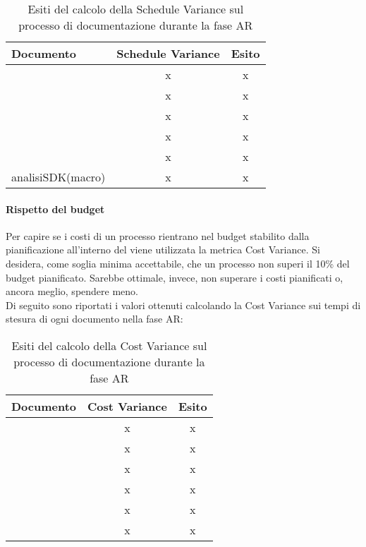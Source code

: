 \documentclass[PianoDiQualifica.tex]{subfiles}
\begin{document}
			\begin{table}[h]
				\centering
				\begin{tabular}{l c c}
					\hline
					\rule[-0.3cm]{0cm}{0.8cm}
					\textbf{Documento} & \textbf{Schedule Variance} & \textbf{Esito} \\
					\hline
					\rule[0cm]{0cm}{0.4cm}
					\PPdocRR & x & x \\
					\rule[0cm]{0cm}{0.4cm}
					\NPdocRR & x & x \\ 
					\rule[0cm]{0cm}{0.4cm}
					\ARdocRR & x & x \\ 
					\rule[0cm]{0cm}{0.4cm}
					\PQdocRR & x & x \\ 
					\rule[0cm]{0cm}{0.4cm}
					\Gldoc & x & x \\ 
					\rule[0cm]{0cm}{0.4cm}
					analisiSDK(macro) & x & x \\ 
					\hline
				\end{tabular}
				\caption{Esiti del calcolo della Schedule Variance sul processo di documentazione durante la fase AR}
			\end{table}
		\paragraph{Rispetto del budget}
		Per capire se i costi di un processo rientrano nel budget stabilito dalla pianificazione all'interno del 				\PPdocRR{} viene utilizzata la metrica Cost Variance. Si desidera, come soglia minima accettabile, che un 				processo non superi il 10\% del budget pianificato. Sarebbe ottimale, invece, non superare i costi pianificati 			o, ancora meglio, spendere meno.\\
		Di seguito sono riportati i valori ottenuti calcolando la Cost Variance sui tempi di stesura di ogni 				documento nella fase AR:\\
\begin{table}[h]
				\centering
				\begin{tabular}{l c c}
					\hline
					\rule[-0.3cm]{0cm}{0.8cm}
					\textbf{Documento} & \textbf{Cost Variance} & \textbf{Esito} \\
					\hline
					\rule[0cm]{0cm}{0.4cm}
					\PPdocRR & x & x \\
					\rule[0cm]{0cm}{0.4cm}
					\NPdocRR & x & x \\ 
					\rule[0cm]{0cm}{0.4cm}
					\ARdocRR & x & x \\ 
					\rule[0cm]{0cm}{0.4cm}
					\PQdocRR & x & x \\ 
					\rule[0cm]{0cm}{0.4cm}
					\Gldoc & x & x \\ 
					\rule[0cm]{0cm}{0.4cm}
					\SDKdoc & x & x \\ 
					\hline
				\end{tabular}
				\caption{Esiti del calcolo della Cost Variance sul processo di documentazione durante la fase AR}
			\end{table}		
		
\end{document}
